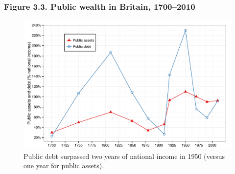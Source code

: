 \documentclass[t]{beamer}\usepackage[]{graphicx}\usepackage[]{color}
\newenvironment{knitrout}{}{} %
\begin{document}
\begin{frame}[label=Figure_3_3]
\frametitle{Figure 3.3. Public wealth in Britain, 1700--2010}
\begin{figure}[t]
\begin{minipage}[b]{\textwidth}
\centering
\begin{knitrout}\footnotesize
{}\color{fgcolor}

{\centering \includegraphics[width=1\linewidth]{figures/color/Figure_3_3} 

}



\end{knitrout}
\caption{Public debt surpassed two years of national income in 1950 (versus one year for public assets).}
\end{minipage}
\end{figure}
\end{frame}
\end{document}
